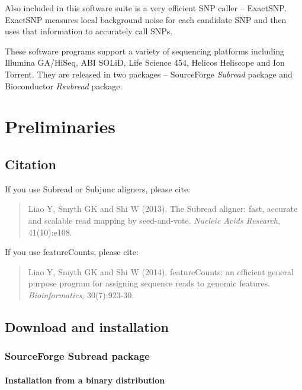 \documentclass[12pt]{report}
\newcommand{\Subread}{\textsf{Subread}}
\newcommand{\Subjunc}{\textsf{Subjunc}}
\newcommand{\ExactSNP}{\textsf{ExactSNP}}
\newcommand{\featureCounts}{\textsf{featureCounts}}
\begin{document}
Also included in this software suite is a very efficient SNP caller -- {\ExactSNP}.
{\ExactSNP} measures local background noise for each candidate SNP and then uses that information to accurately call SNPs.

These software programs support a variety of sequencing platforms including Illumina GA/HiSeq, ABI SOLiD, Life Science 454, Helicos Heliscope and Ion Torrent. They are released in two packages -- SourceForge \emph{Subread} package and Bioconductor \emph{Rsubread} package.

\chapter{Preliminaries}

\section{Citation}

If you use {\Subread} or {\Subjunc} aligners, please cite:

\begin{quote}
Liao Y, Smyth GK and Shi W (2013). The Subread aligner: fast, accurate and scalable read mapping by seed-and-vote. \emph{Nucleic Acids Research}, 41(10):e108.
\\
{ }
\end{quote}

{\noindent If you use \featureCounts, please cite:}
\begin{quote}
Liao Y, Smyth GK and Shi W (2014). featureCounts: an efficient general purpose program for assigning sequence reads to genomic features. \emph{Bioinformatics}, 30(7):923-30.
\\
{}
\end{quote}


\section{Download and installation}

\subsection{SourceForge {\Subread} package}

\subsubsection{Installation from a binary distribution}
\end{document}
